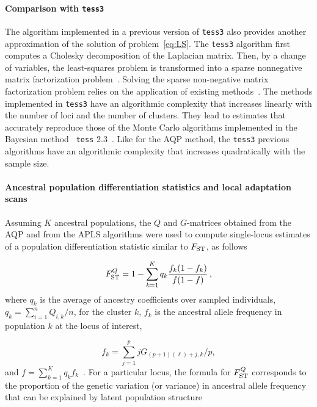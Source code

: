 \paragraph{Comparison with {\tt tess3}} The algorithm implemented in a previous
version of {\tt tess3} also provides another approximation of the solution
of problem~\eqref{eq:LS}. The {\tt tess3} algorithm first computes a Cholesky
decomposition of the Laplacian matrix. Then, by a change of variables, the
least-squares problem is transformed into a sparse nonnegative matrix
factorization problem~\citep{Caye2016}. Solving the sparse non-negative matrix
factorization problem relies on the application of existing
methods~\citep{Kim2011, Frichot2014}. The methods implemented in {\tt tess3}
have an algorithmic complexity that increases linearly with the number of loci
and the number of clusters. They lead to estimates that accurately reproduce
those of the Monte Carlo algorithms implemented in the Bayesian method {\tt
  tess} 2.3~\citep{Caye2016}. Like for the AQP method, the {\tt tess3} previous
algorithms have an algorithmic complexity that increases quadratically with the
sample size.




\paragraph{Ancestral population differentiation statistics and local adaptation
  scans} Assuming $K$ ancestral populations, the $Q$ and $G$-matrices obtained
from the AQP and from the APLS algorithms were used to compute single-locus
estimates of a population differentiation statistic similar to $F_{\rm
  ST}$, as follows

$$
F^{Q}_{\rm ST} = 1 - \sum_{k=1}^K  q_k \frac{f_k (1-f_k)}{f(1-f)} \, ,
$$
\noindent where $q_k$ is the average of ancestry coefficients over sampled
individuals, $q_k = \sum_{i =1}^n Q_{i,k}/n$, for the cluster $k$, $f_k$ is the
ancestral allele frequency in population $k$ at the locus of interest,

$$
f_k =  \sum_{j = 1}^p  j G_{(p+1)(\ell) + j, k}/p ,
$$
and $f = \sum_{k = 1}^K q_k f_k$~\citep{Martins2016}.
For a particular locus, the formula for $F^Q_{\rm ST}$ corresponds to the
proportion of the genetic variation (or variance) in ancestral allele frequency
that can be explained by latent population structure

